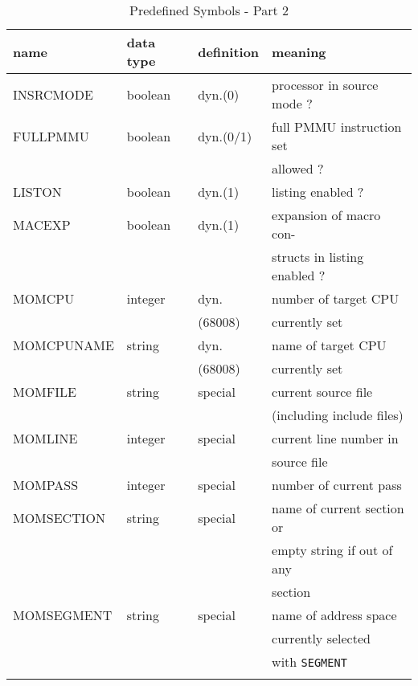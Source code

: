 \documentclass[12pt,twoside]{report}
\newcommand{\tty}[1]{{\tt #1}}
\begin{document}
\begin{table*}[htb]
\begin{center}\begin{tabular}{|l|l|l|l|}
\hline
name             &  data type   & definition & meaning \\
\hline\hline
INSRCMODE     & boolean   & dyn.(0)    & processor in source mode ? \\
FULLPMMU      & boolean   & dyn.(0/1)  & full PMMU instruction set \\
              &           &            & allowed ? \\
LISTON        & boolean   & dyn.(1)    & listing enabled ? \\
MACEXP        & boolean   & dyn.(1)    & expansion of macro con- \\
              &           &            & structs in listing enabled ? \\
MOMCPU        & integer   & dyn.       & number of target CPU \\
	      & 	  & (68008)    & currently set \\
MOMCPUNAME    & string    & dyn.       & name of target CPU \\
              &           & (68008)    & currently set \\
MOMFILE       & string    & special    & current source file \\
              &           &            & (including include files) \\
MOMLINE       & integer   & special    & current line number in  \\
              &           &            & source file \\
MOMPASS       & integer   & special    & number of current pass \\
MOMSECTION    & string    & special    & name of current section or \\
	      & 	  &	       & empty string if out of any \\
              &           &            & section \\
MOMSEGMENT    & string    & special    & name of address space \\
              &           &            & currently selected \\
              &           &            & with \tty{SEGMENT} \\
              &           &            & \\
\hline
\end{tabular}\end{center}
\caption{Predefined Symbols - Part 2\label{TabInternSyms2}}
\end{table*}
\end{document}
